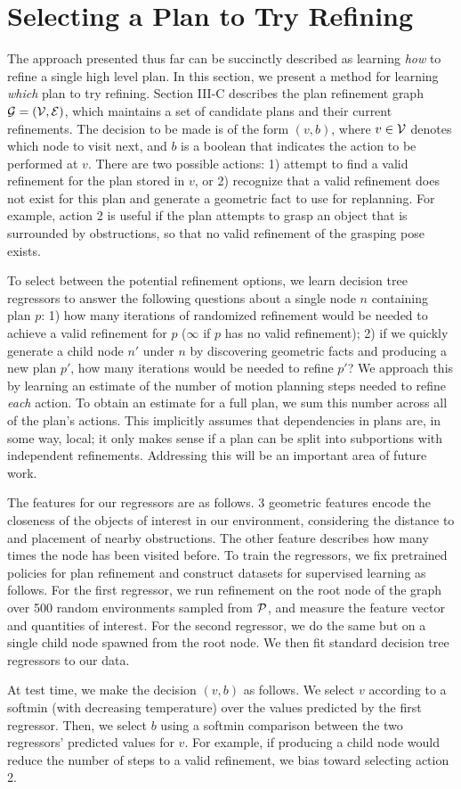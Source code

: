 \section{Selecting a Plan to Try Refining}
The approach presented thus far can be succinctly described as learning \emph{how} to
refine a single high level plan. In this section, we present a method for learning
\emph{which} plan to try refining. Section III-C describes the plan refinement graph $\mathcal{G} = (\mathcal{V}, \mathcal{E})$,
which maintains a set of candidate plans and their current refinements. The decision to be made is of the form $(v, b)$,
where $v \in \mathcal{V}$ denotes which node to visit next, and $b$ is a boolean that indicates the action
to be performed at $v$. There are two possible actions: 1) attempt to find a valid refinement
for the plan stored in $v$, or 2) recognize that a valid refinement does not exist for this plan
and generate a geometric fact to use for replanning. For example, action 2
is useful if the plan attempts to grasp an object that is surrounded by obstructions,
so that no valid refinement of the grasping pose exists.

To select between the potential refinement options, we learn decision tree regressors
to answer the following questions about a single node $n$ containing plan $p$: 1) how many iterations of randomized refinement
would be needed to achieve a valid refinement for $p$ ($\infty$ if $p$ has no valid refinement); 2)
if we quickly generate a child node $n'$ under $n$ by discovering geometric facts and producing a new plan $p'$,
how many iterations would be needed to refine $p'$? We approach this by learning an estimate of the
number of motion planning steps needed to refine \emph{each} action. To obtain an estimate for a full plan, we
sum this number across all of the plan's actions. This implicitly assumes that dependencies in plans are, in some way, local;
it only makes sense if a plan can be split into subportions with independent refinements.
Addressing this will be an important area of future work.

The features for our regressors are as follows. 3 geometric features encode the closeness of the objects
of interest in our environment, considering the distance to and placement of nearby obstructions. The other
feature describes how many times the node has been visited before. To train the regressors, we fix pretrained
policies for plan refinement and construct datasets for supervised learning as follows.
For the first regressor, we run refinement on the root
node of the graph over 500 random environments sampled from $\mathcal{P}$, and measure the feature vector and quantities of interest.
For the second regressor, we do the same but on a single child node spawned from the root node.
We then fit standard decision tree regressors to our data.

At test time, we make the decision $(v, b)$ as follows. We select $v$ according to a softmin (with decreasing temperature) over the values
predicted by the first regressor. Then, we select $b$ using a softmin comparison between the two regressors'
predicted values for $v$. For example, if producing a child node would reduce the number of steps to a valid refinement,
we bias toward selecting action 2.